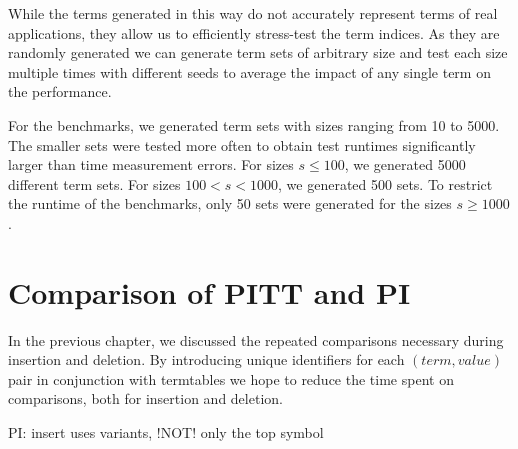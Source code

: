 While the terms generated in this way do not accurately represent terms of real applications, they allow us to efficiently stress-test the term indices. As they are randomly generated we can generate term sets of arbitrary size and test each size multiple times with different seeds to average the impact of any single term on the performance.

For the benchmarks, we generated term sets with sizes ranging from 10 to 5000. The smaller sets were tested more often to obtain test runtimes significantly larger than time measurement errors. For sizes $s \leq 100$, we generated 5000 different term sets. For sizes $100 < s < 1000$, we generated 500 sets. To restrict the runtime of the benchmarks, only 50 sets were generated for the sizes $s \geq 1000$.


\section{Comparison of PITT and PI}
In the previous chapter, we discussed the repeated comparisons necessary during insertion and deletion. By introducing unique identifiers for each $(term,value)$ pair in conjunction with termtables we hope to reduce the time spent on comparisons, both for insertion and deletion.

PI: insert uses variants, !NOT! only the top symbol

